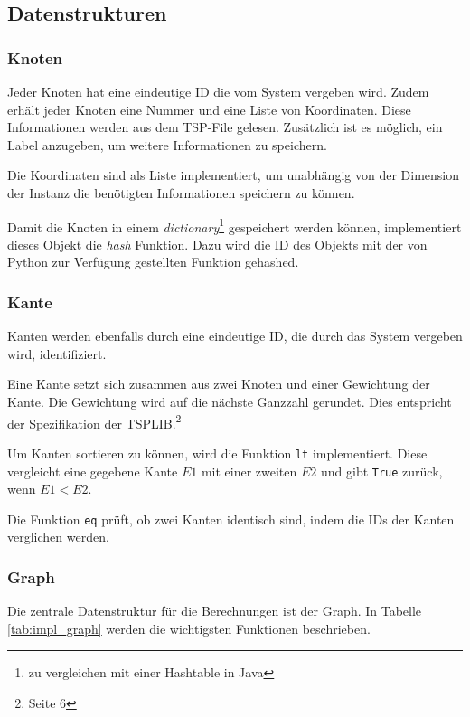 \documentclass[11pt,a4paper]{article}
\begin{document}
\subsection{Datenstrukturen}
\subsubsection{Knoten}
Jeder Knoten hat eine eindeutige ID die vom System vergeben wird. Zudem erhält jeder Knoten eine Nummer und eine Liste von Koordinaten. Diese Informationen werden aus dem TSP-File gelesen. Zusätzlich ist es möglich, ein Label anzugeben, um weitere Informationen zu speichern.

Die Koordinaten sind als Liste implementiert, um unabhängig von der Dimension der Instanz die benötigten Informationen speichern zu können.

Damit die Knoten in einem \emph{dictionary}\footnote{zu vergleichen mit einer Hashtable in Java} gespeichert werden können, implementiert dieses Objekt die \emph{hash} Funktion. Dazu wird die ID des Objekts mit der von Python zur Verfügung gestellten Funktion gehashed.

\subsubsection{Kante}
Kanten werden ebenfalls durch eine eindeutige ID, die durch das System vergeben wird, identifiziert.

Eine Kante setzt sich zusammen aus zwei Knoten und einer Gewichtung der Kante. Die Gewichtung wird auf die nächste Ganzzahl gerundet. Dies entspricht der Spezifikation der TSPLIB.\footnote{\cite{reinelt95} Seite 6}

Um Kanten sortieren zu können, wird die Funktion \texttt{\textunderscore\textunderscore lt\textunderscore\textunderscore} implementiert. Diese vergleicht eine gegebene Kante $E1$ mit einer zweiten $E2$ und gibt \texttt{True} zurück, wenn $E1 < E2$.

Die Funktion \texttt{\textunderscore\textunderscore eq\textunderscore\textunderscore} prüft, ob zwei Kanten identisch sind, indem die IDs der Kanten verglichen werden.

\subsubsection{Graph}
Die zentrale Datenstruktur für die Berechnungen ist der Graph. In Tabelle \ref{tab:impl_graph} werden die wichtigsten Funktionen beschrieben.
\end{document}
